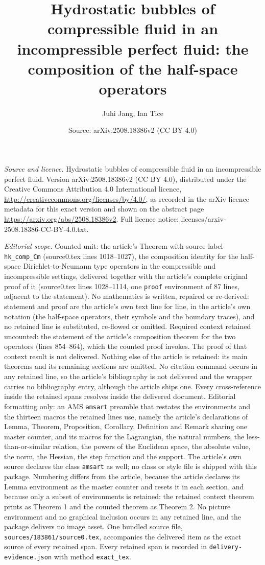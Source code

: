 \documentclass[10pt,a4paper]{amsart}
\title[Hydrostatic bubbles of compressible fluid]{Hydrostatic bubbles of compressible fluid in an incompressible perfect fluid: the composition of the half-space operators}
\author{Juhi Jang, Ian Tice}
\date{Source: arXiv:2508.18386v2 (CC BY 4.0)}
\theoremstyle{plain}
\theoremstyle{definition}
\theoremstyle{remark}
\begin{document}
\maketitle
\noindent\emph{Source and licence.} Hydrostatic bubbles of compressible fluid in an incompressible perfect fluid. Version arXiv:2508.18386v2 (CC BY 4.0), distributed under the Creative Commons Attribution 4.0 International licence, \url{http://creativecommons.org/licenses/by/4.0/}, as recorded in the arXiv licence metadata for this exact version and shown on the abstract page \url{https://arxiv.org/abs/2508.18386v2}. Full licence notice: licenses/arxiv-2508.18386-CC-BY-4.0.txt.\par\smallskip

\noindent\textit{Editorial scope.} Counted unit: the article's Theorem with source label \texttt{hk\_comp\_Cm} (source0.tex lines 1018--1027), the composition identity for the half-space Dirichlet-to-Neumann type operators in the compressible and incompressible settings, delivered together with the article's complete original proof of it (source0.tex lines 1028--1114, one \texttt{proof} environment of 87 lines, adjacent to the statement). No mathematics is written, repaired or re-derived: statement and proof are the article's own text line for line, in the article's own notation (the half-space operators, their symbols and the boundary traces), and no retained line is substituted, re-flowed or omitted. Required context retained uncounted: the statement of the article's composition theorem for the two operators (lines 854--864), which the counted proof invokes. The proof of that context result is not delivered. Nothing else of the article is retained: its main theorems and its remaining sections are omitted. No citation command occurs in any retained line, so the article's bibliography is not delivered and the wrapper carries no bibliography entry, although the article ships one. Every cross-reference inside the retained spans resolves inside the delivered document. Editorial formatting only: an AMS \texttt{amsart} preamble that restates the environments and the thirteen macros the retained lines use, namely the article's declarations of Lemma, Theorem, Proposition, Corollary, Definition and Remark sharing one master counter, and its macros for the Lagrangian, the natural numbers, the less-than-or-similar relation, the powers of the Euclidean space, the absolute value, the norm, the Hessian, the step function and the support. The article's own source declares the class \texttt{amsart} as well; no class or style file is shipped with this package. Numbering differs from the article, because the article declares its Lemma environment as the master counter and resets it in each section, and because only a subset of environments is retained: the retained context theorem prints as Theorem 1 and the counted theorem as Theorem 2. No picture environment and no graphical inclusion occurs in any retained line, and the package delivers no image asset. One bundled source file, \texttt{sources/183861/source0.tex}, accompanies the delivered item as the exact source of every retained span. Every retained span is recorded in \texttt{delivery-evidence.json} with method \texttt{exact\_tex}.
\end{document}
